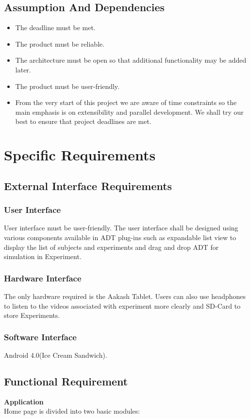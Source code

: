 \documentclass[12pt]{report}
\begin{document}
\section{Assumption And Dependencies}

\begin{itemize}
\item The deadline must be met. 
\item The product must be reliable. 
\item The architecture must be open so that additional functionality may be added later. 
\item The product must be user‐friendly. 
\item From the very start of this project we are aware of time constraints so the main emphasis is on extensibility and parallel development. We shall try our best to ensure
that project deadlines are met.

\end{itemize}

\chapter{Specific Requirements}
\section{External Interface Requirements}
\subsection{User Interface}
User interface must be user-friendly. The user interface shall be designed using various 
components available in ADT plug-ins such as expandable list view to display the list of subjects and experiments and drag and drop ADT for simulation in Experiment. 
\subsection{Hardware Interface}
The only hardware required is the Aakash Tablet. Users can also use headphones to listen to 
the videos associated with experiment more clearly and SD-Card to store Experiments. 
\subsection{Software Interface}
Android 4.0(Ice Cream Sandwich). 
\section{Functional Requirement}
\textbf{Application}\\
Home page is divided into two basic modules: 
\end{document}
